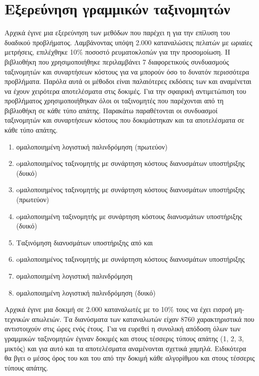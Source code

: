 \section{Εξερεύνηση γραμμικών ταξινομητών}
Αρχικά έγινε μια εξερεύνηση των μεθόδων που παρέχει η  για την επίλυση του δυαδικού προβλήματος. Λαμβάνοντας υπόψη 2.000 καταναλώσεις πελατών με ωριαίες μετρήσεις, επιλέχθηκε 10\% ποσοστό ρευματοκλοπών για την προσομοίωση. Η βιβλιοθήκη που χρησιμοποιήθηκε περιλαμβάνει 7 διαφορετικούς συνδυασμούς ταξινομητών και συναρτήσεων κόστους για να μπορούν όσο το δυνατόν περισσότερα προβλήματα. Παρόλα αυτά οι μέθοδοι  είναι παλαιότερες εκδόσεις των  και αναμένεται να έχουν χειρότερα αποτελέσματα στις δοκιμές. Για την σφαιρική αντιμετώπιση του προβλήματος χρησιμοποιήθηκαν όλοι οι ταξινομητές που παρέχονται από τη βιβλιοθήκη σε κάθε τύπο απάτης. Παρακάτω παραθέτονται οι συνδυασμοί ταξινομητών και συναρτήσεων κόστους που δοκιμάστηκαν και τα αποτελέσματα σε κάθε τύπο απάτης.\par
\begin{enumerate}
\item {} ομαλοποιημένη λογιστική παλινδρόμηση (πρωτεύον)
\item {} oμαλοποιημένος ταξινομητής με  συνάρτηση κόστους διανυσμάτων υποστήριξης (δυικό)
\item {} oμαλοποιημένος ταξινομητής με  συνάρτηση κόστους διανυσμάτων υποστήριξης (πρωτεύον)
\item {} oμαλοποιημένη ταξινομητής με  συνάρτηση κόστους διανυσμάτων υποστήριξης (δυικό)
\item Ταξινόμηση διανυσμάτων υποστήριξης από  και 
\item {} oμαλοποιημένος ταξινομητής με  συνάρτηση κόστους διανυσμάτων υποστήριξης
\item {} ομαλοποιημένη λογιστική παλινδρόμηση
\item {} ομαλοποιημένη λογιστική παλινδρόμηση (δυικό)
\end{enumerate}
Αρχικά έγινε μια δοκιμή σε 2.000 καταναλωτές με το 10\% τους να έχει εισροή μη-τεχνικών απωλειών. Τα διανύσματα των καταναλωτών είχαν 8760 χαρακτηριστικά που αντιστοιχούν στις ώρες ενός έτους. Για να ευρεθεί η συνολική απόδοση όλων των γραμμικών ταξινομητών έγιναν δοκιμές και στους τέσσερις τύπους απάτης (1, 2, 3, μικτός) και για αυτό και τα αποτελέσματα αναμένονται σχετικά χαμηλά. Ειδικότερα θα βγει ο μέσος όρος του  και του  από την δοκιμή κάθε αλγορίθμου και στους τέσσερις τύπους απάτης.\par
